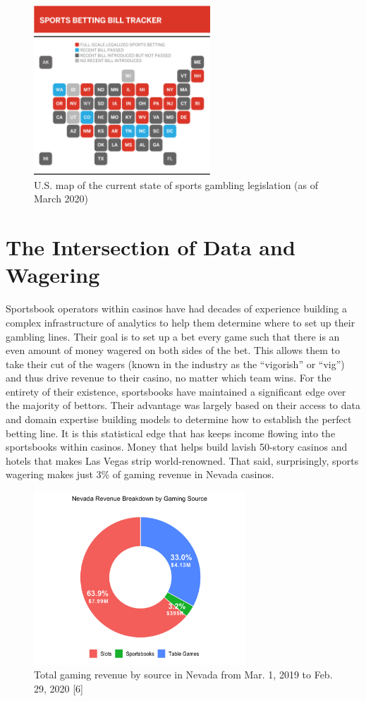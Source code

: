\documentclass [MS] {uclathes}
\begin{document}
\begin{figure}[h]
\centering
  \includegraphics[width=250px]{20200326_betting_map.png}
  \caption{U.S. map of the current state of sports gambling legislation (as of March 2020)}
\end{figure}

\section{The Intersection of Data and Wagering}
\noindent Sportsbook operators within casinos have had decades of experience building a complex infrastructure of analytics to help them determine where to set up their gambling lines. Their goal is to set up a bet every game such that there is an even amount of money wagered on both sides of the bet. This allows them to take their cut of the wagers (known in the industry as the ``vigorish'' or ``vig'') and thus drive revenue to their casino, no matter which team wins. For the entirety of their existence, sportsbooks have maintained a significant edge over the majority of bettors. Their advantage was largely based on their access to data and domain expertise building models to determine how to establish the perfect betting line. It is this statistical edge that has keeps income flowing into the sportsbooks within casinos. Money that helps build lavish 50-story casinos and hotels that makes Las Vegas strip world-renowned. That said, surprisingly, sports wagering makes just 3\% of gaming revenue in Nevada casinos. \\

\begin{figure}[h]
\centering
  \includegraphics[width=300px]{gaming_revenue.png}
  \caption{Total gaming revenue by source in Nevada from Mar. 1, 2019 to Feb. 29, 2020 [6]}
\end{figure}
\end{document}

